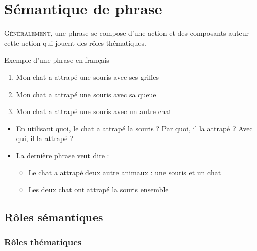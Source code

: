 \documentclass{KodeBook}
\begin{document}
		\mainmatter
	
\fi
\chapter{Sémantique de phrase}

\begin{introduction}
	\lettrine{G}{énéralement}, une phrase se compose d'une action et des composants auteur cette action qui jouent des rôles thématiques.
\end{introduction} 

\begin{exampleblock}{Exemple d'une phrase en français}
	\begin{center}
		\Large\bfseries
		\begin{enumerate}
			\item Mon chat a attrapé une souris avec ses griffes 
			\item Mon chat a attrapé une souris avec sa queue
			\item Mon chat a attrapé une souris avec un autre chat
		\end{enumerate}
	\end{center}
\end{exampleblock}

\begin{itemize}
	\item En utilisant quoi, le chat a attrapé la souris ? Par quoi, il la attrapé ? Avec qui, il la attrapé ?
	\item La dernière phrase veut dire : 
	\begin{itemize}
		\item Le chat a attrapé deux autre animaux : une souris et un chat
		\item Les deux chat ont attrapé la souris ensemble
	\end{itemize}
\end{itemize}


\section{Rôles sémantiques}

\subsection{Rôles thématiques}
\end{document}

